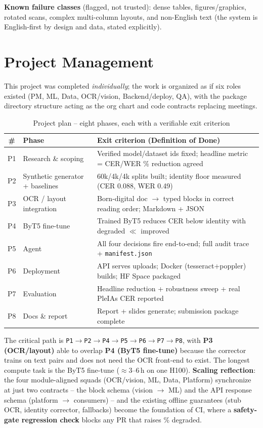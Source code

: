 \documentclass[12pt,a4paper]{article}
\begin{document}
\textbf{Known failure classes} (flagged, not trusted): dense tables, figures/graphics, rotated scans, complex multi-column layouts, and non-English text (the system is English-first by design and data, stated explicitly).

\section{Project Management}

This project was completed \textit{individually}; the work is organized as if six roles existed (PM, ML, Data, OCR/vision, Backend/deploy, QA), with the package directory structure acting as the org chart and code contracts replacing meetings.

\begin{table}[H]
\centering
\caption{Project plan -- eight phases, each with a verifiable exit criterion}
\small
\begin{tabularx}{\linewidth}{@{} c l L @{}}
\toprule
\textbf{\#} & \textbf{Phase} & \textbf{Exit criterion (Definition of Done)} \\
\midrule
P1 & Research \& scoping & Verified model/dataset ids fixed; headline metric = CER/WER \% reduction agreed \\
P2 & Synthetic generator + baselines & 60k/4k/4k splits built; identity floor measured (CER 0.088, WER 0.49) \\
P3 & OCR / layout integration & Born-digital doc $\rightarrow$ typed blocks in correct reading order; Markdown + JSON \\
P4 & ByT5 fine-tune & Trained ByT5 reduces CER below identity with degraded $\ll$ improved \\
P5 & Agent & All four decisions fire end-to-end; full audit trace + \texttt{manifest.json} \\
P6 & Deployment & API serves uploads; Docker (tesseract+poppler) builds; HF Space packaged \\
P7 & Evaluation & Headline reduction + robustness sweep + real PleIAs CER reported \\
P8 & Docs \& report & Report + slides generate; submission package complete \\
\bottomrule
\end{tabularx}
\end{table}

\noindent The critical path is \texttt{P1$\rightarrow$P2$\rightarrow$P4$\rightarrow$P5$\rightarrow$P6$\rightarrow$P7$\rightarrow$P8}, with \textbf{P3 (OCR/layout)} able to overlap \textbf{P4 (ByT5 fine-tune)} because the corrector trains on text pairs and does not need the OCR front-end to exist. The longest compute task is the ByT5 fine-tune ($\approx$3--6\,h on one H100). \textbf{Scaling reflection}: the four module-aligned squads (OCR/vision, ML, Data, Platform) synchronize at just two contracts -- the block schema (vision $\rightarrow$ ML) and the API response schema (platform $\rightarrow$ consumers) -- and the existing offline guarantees (stub OCR, identity corrector, fallbacks) become the foundation of CI, where a \textbf{safety-gate regression check} blocks any PR that raises \% degraded.
\end{document}
